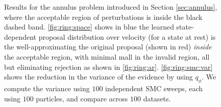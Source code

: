 \begin{figure}[h!]
\caption{Results for the annulus problem introduced in Section \ref{sec:annulus}, where the acceptable region of perturbations is inside the black dashed band.
\ref{fig:ring:space} shows in blue the learned state-dependent proposal distribution over velocity (for a state at rest) is the well-approximating the original proposal (shown in red) \emph{inside} the acceptable region, with minimal mall in the invalid region, all but eliminating rejection as shown in \ref{fig:ring:ar}.
\ref{fig:ring:smc:var} shows the reduction in the variance of the evidence by using $q_{\phi}$.
We compute the variance using $100$ independent SMC sweeps, each using $100$ particles, and compare across $100$ datasets.
}
\label{fig:ring}
\end{figure}
